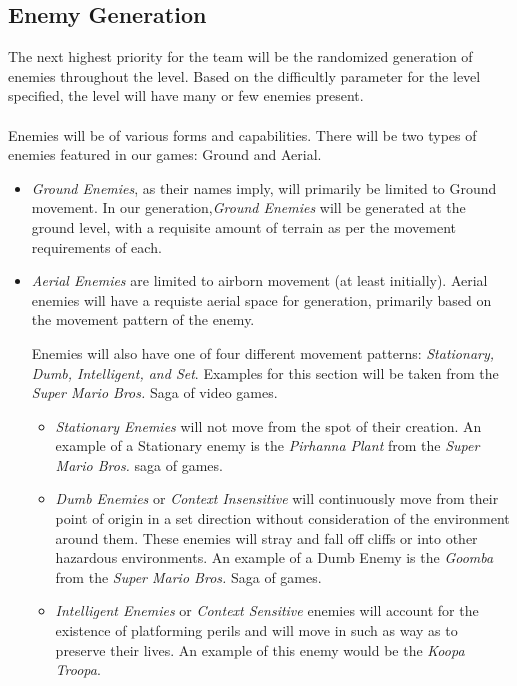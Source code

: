 \documentclass[pdftex,12pt,letter]{article}
\begin{document}
\subsection{Enemy Generation}
The next highest priority for the team will be the randomized generation of enemies throughout the level. Based on the difficultly parameter for the level specified, the level will have many or few enemies present. 
\\\\
Enemies will be of various forms and capabilities. There will be two types of enemies featured in our games: Ground and Aerial.
\begin{itemize}

\item \textit{Ground Enemies}, as their names imply, will primarily be limited to Ground movement. In our generation,\textit{Ground Enemies} will be generated at the ground level, with a requisite amount of terrain as per the movement requirements of each. 

\item \textit{Aerial Enemies} are limited to airborn movement (at least initially). Aerial enemies will have a requiste aerial space for generation, primarily based on the movement pattern of the enemy. \\

\endgroup


Enemies will also have one of four different movement patterns: \textit{Stationary, Dumb, Intelligent, and Set}. Examples for this section will be taken from the \textit{Super Mario Bros.} Saga of video games. 
\begin{itemize}

\item \textit{Stationary Enemies} will not move from the spot of their creation. An example of a Stationary enemy is the \textit{Pirhanna Plant} from the \textit{Super Mario Bros.} saga of games.

\item \textit{Dumb Enemies} or \textit{Context Insensitive} will continuously move from their point of origin in a set direction without consideration of the environment around them. These enemies will stray and fall off cliffs or into other hazardous environments. An example of a Dumb Enemy is the \textit{Goomba} from the \textit{Super Mario Bros.} Saga of games.

\item \textit{Intelligent Enemies} or \textit{Context Sensitive} enemies will account for the existence of platforming perils and will move in such as way as to preserve their lives. An example of this enemy would be the \textit{Koopa Troopa}.


\end{itemize}
\end{itemize}
\end{document}
